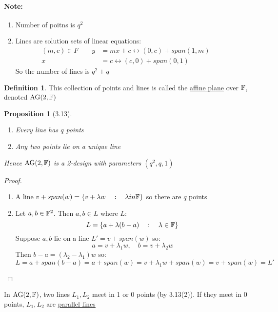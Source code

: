 \documentclass[]{article}
\newtheorem{prop}[thm]{Proposition}
\theoremstyle{definition}
\newtheorem*{defn}{Definition}
\theoremstyle{remark}
\numberwithin{equation}{section}
\begin{document}
			\paragraph*{Note:}
			\begin{enumerate}
				\item Number of poitns is $q^2$
				\item Lines are solution sets of linear equations:
					\begin{align*}
					(m,c)\in F \qquad
						y &= mx+c \leftrightarrow (0,c) + span(1,m)\qquad \\
						x &= c \leftrightarrow (c,0) + span(0,1)
					\end{align*}
					So the number of lines is $q^2+q$
			\end{enumerate}

			\begin{defn}
				This collection of points and lines is called the \underline{affine plane} over $\mathbb F$, denoted $\text{AG}(2,\mathbb F)$
			\end{defn}


			\begin{prop}[3.13]\hfill
				\begin{enumerate}
					\item Every line has $q$ points
					\item Any two points lie on a unique line
				\end{enumerate}

				Hence $\text{AG}(2,\mathbb F)$ is a 2-design with parameters $(q^2, q, 1)$
			\end{prop}

			\begin{proof}\hfill
				\begin{enumerate}
					\item A line $v + span(w) = \{ v + \lambda w \quad:\quad \lambda in \mathbb F\}$ so there are $q$ points
					\item Let $a,b \in \mathbb F^2$. Then $a, b \in L$ where $L$:
					\[
						L = \{a + \lambda(b-a)\quad:\quad \lambda \in \mathbb F\}
					\]
					Suppose $a,b$ lie on a line $L' = v + span(w)$ so:
					\[
						a = v + \lambda_1 w,\quad b = v + \lambda_2 w
					\]
					Then $b-a = (\lambda_2 - \lambda_1)w$ so:
					\[
						L = a + span(b-a) = a + span(w) = v + \lambda_1 w + span(w) = v + span(w) = L'
					\]
				\end{enumerate}
			\end{proof}

			In  $\text{AG}(2,\mathbb F)$, two lines $L_1, L_2$ meet in 1 or 0 points (by 3.13(2)). If they meet in 0 points, $L_1, L_2$ are \underline{parallel lines}
\end{document}
